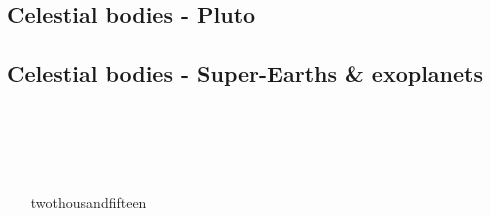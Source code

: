 \begin{scriptsize}
\begin{itemize}
\item[\twothousandseven] 
\textcite{reki07} 
\item[\twothousandeight] 
\textcite{king08} 
\item[\twothousandtwelve] 
\textcite{roba12}  
\item[\twothousandtwentyone] 
\textcite{gult21} 
\end{itemize}
\end{scriptsize}

\subsection{Celestial bodies - Pluto}

\begin{scriptsize}
\begin{itemize}
\item[\twothousandsixteen] \textcite{mcnw16} 
\end{itemize}
\end{scriptsize}

\subsection{Celestial bodies - Super-Earths \& exoplanets}

\begin{scriptsize}
\begin{itemize}
\item[\twothousandeleven]
\textcite{stfl11} \\
\textcite{vata11} \\
\item[\twothousandthirteen]
\textcite{stlh13} \\
\item[twothousandfifteen] 
\textcite{welo15} \\
\textcite{miko15} \\
\textcite{kamo15} \\
\end{itemize}
\end{scriptsize}

